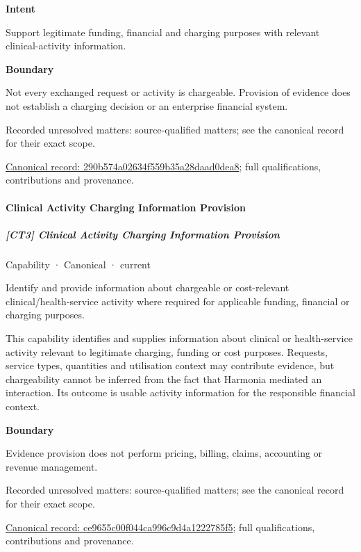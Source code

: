 \textbf{Intent}



Support legitimate funding, financial and charging purposes with relevant clinical-activity information.



\textbf{Boundary}



Not every exchanged request or activity is chargeable. Provision of evidence does not establish a charging decision or an enterprise financial system.


{\small Recorded unresolved matters: source-qualified matters; see the canonical record for their exact scope.}\par
{\footnotesize \href{../../../../continuum/strategy/capability/290b574a02634f559b35a28daad0dea8.md}{Canonical record: 290b574a02634f559b35a28daad0dea8}; full qualifications, contributions and provenance.}\par
\paragraph{Clinical Activity Charging Information Provision}

\subparagraph{[CT3] Clinical Activity Charging Information Provision}

\label{element:ce9655c00f044ca996c9d4a1222785f5}
{\small Capability · Canonical · current}\par

Identify and provide information about chargeable or cost-relevant clinical/health-service activity where required for applicable funding, financial or charging purposes.



This capability identifies and supplies information about clinical or health-service activity relevant to legitimate charging, funding or cost purposes. Requests, service types, quantities and utilisation context may contribute evidence, but chargeability cannot be inferred from the fact that Harmonia mediated an interaction. Its outcome is usable activity information for the responsible financial context.



\textbf{Boundary}



Evidence provision does not perform pricing, billing, claims, accounting or revenue management.


{\small Recorded unresolved matters: source-qualified matters; see the canonical record for their exact scope.}\par
{\footnotesize \href{../../../../continuum/strategy/capability/ce9655c00f044ca996c9d4a1222785f5.md}{Canonical record: ce9655c00f044ca996c9d4a1222785f5}; full qualifications, contributions and provenance.}\par
